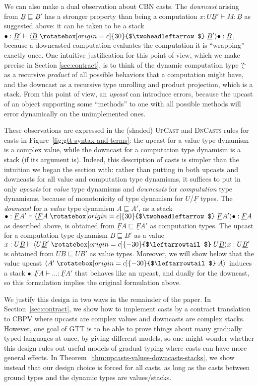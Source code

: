 \documentclass[acmsmall,nonacm]{acmart}
\renewcommand{\u}{\underline}
\newcommand{\ltdyn}{\sqsubseteq}
\newcommand{\dync}{\u {\text{?`}}}
\newcommand{\uarrow}{\mathrel{\rotatebox[origin=c]{-30}{$\leftarrowtail$}}}
\newcommand{\darrow}{\mathrel{\rotatebox[origin=c]{30}{$\twoheadleftarrow$}}}
\newcommand{\upcast}[2]{\langle{#2}\uarrow{#1}\rangle}
\newcommand{\dncast}[2]{\langle{#1}\darrow{#2}\rangle}
\begin{document}
We can also make a dual observation about CBN casts.  The
\emph{downcast} arising from $\u B \ltdyn \u B'$ has a stronger property
than being a computation $x : U \u B' \vdash M : \u B$ as suggested
above: it can be taken to be a stack $\bullet : \u B' \vdash \dncast{\u
  B}{\u B'}{\bullet} : \u B$, because a downcasted computation
evaluates the computation it is ``wrapping'' exactly once.  One
intuitive justification for this point of view, which we make precise
in Section \ref{sec:contract}, is to think of the dynamic computation type $\dync$ as a
recursive \emph{product} of all possible behaviors that a computation
might have, and the downcast as a recursive type unrolling and product
projection, which is a stack.  From this point of view, an \emph{upcast}
can introduce errors, because the upcast of an object supporting some
``methods'' to one with all possible methods will error dynamically on
the unimplemented ones.

These observations are expressed in the (shaded) \textsc{UpCast} and
\textsc{DnCasts} rules for casts in
Figure~\ref{fig:gtt-syntax-and-terms}: the upcast for a value type
dynamism is a complex value, while the downcast for a computation type
dynamism is a stack (if its argument is).  Indeed, this description of
casts is simpler than the intuition we began the section with: rather
than putting in both upcasts and downcasts for all value and computation
type dynamisms, it suffices to put in only \emph{upcasts} for
\emph{value} type dynamisms and \emph{downcasts} for \emph{computation}
type dynamisms, because of monotonicity of type dynamism for $U$/$\u F$
types.  The \emph{downcast} for a \emph{value} type dynamism $A \ltdyn
A'$, as a stack $\bullet : \u F A' \vdash \dncast{\u F A}{\u F
  A'}{\bullet} : \u F A$ as described above, is obtained from $\u F A
\ltdyn \u F A'$ as computation types.  The upcast for a computation type
dynamism $\u B \ltdyn \u B'$ as a value $x : U \u B \vdash \upcast{U \u
  B}{U \u B'}{x} : U \u B'$ is obtained from $U \u B \ltdyn U \u B'$ as
value types.  Moreover, we will show below that the value upcast
$\upcast{A}{A'}$ induces a stack $\bullet : \u F A \vdash \ldots : \u F
A'$ that behaves like an upcast, and dually for the downcast, so this
formulation implies the original formulation above.

We justify this design in two ways in the remainder of the paper.  In
Section~\ref{sec:contract}, we show how to implement casts by a
contract translation to CBPV where upcasts are complex values and
downcasts are complex stacks.
%
However, one goal of
GTT is to be able to prove things about many gradually typed languages
at once, by giving different models, so one might wonder whether this
design rules out useful models of gradual typing where casts can have more general effects.  In
Theorem~\ref{thm:upcasts-values-downcasts-stacks}, we show instead that
our design choice is forced for all casts, as long as the casts between ground types and the dynamic types are values/stacks.
\end{document}
